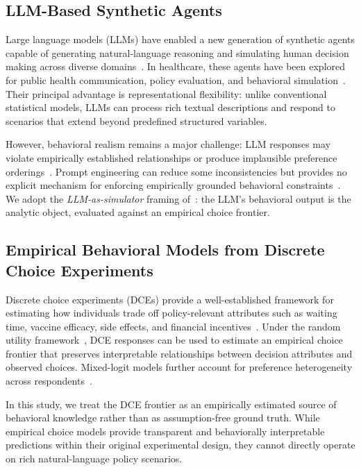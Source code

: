 \documentclass[11pt]{article}
\begin{document}
\subsection{LLM-Based Synthetic Agents}

Large language models (LLMs) have enabled a new generation of synthetic agents capable of generating natural-language reasoning and simulating human decision making across diverse domains~\citep{Bommasani2021, Park2023a, Mu2024}. In healthcare, these agents have been explored for public health communication, policy evaluation, and behavioral simulation~\citep{Sehgal2025, Gullison2025}. Their principal advantage is representational flexibility: unlike conventional statistical models, LLMs can process rich textual descriptions and respond to scenarios that extend beyond predefined structured variables.

However, behavioral realism remains a major challenge: LLM responses may violate empirically established relationships or produce implausible preference orderings~\citep{Aher2022TuringExperiments, Horton2023, hintze2025nonlinear}. Prompt engineering can reduce some inconsistencies but provides no explicit mechanism for enforcing empirically grounded behavioral constraints~\citep{wang2025simulate, wang2025heating}. We adopt the \emph{LLM-as-simulator} framing of~\citet{Argyle2023, Horton2023}: the LLM's behavioral output is the analytic object, evaluated against an empirical choice frontier.

\subsection{Empirical Behavioral Models from Discrete Choice Experiments}

Discrete choice experiments (DCEs) provide a well-established framework for estimating how individuals trade off policy-relevant attributes such as waiting time, vaccine efficacy, side effects, and financial incentives~\citep{Soekhai2019a, Chan2024}. Under the random utility framework~\citep{Train2009, louviere2000stated}, DCE responses can be used to estimate an empirical choice frontier that preserves interpretable relationships between decision attributes and observed choices. Mixed-logit models further account for preference heterogeneity across respondents~\citep{hensher2003mixed, hensher2015applied}.

In this study, we treat the DCE frontier as an empirically estimated source of behavioral knowledge rather than as assumption-free ground truth. While empirical choice models provide transparent and behaviorally interpretable predictions within their original experimental design, they cannot directly operate on rich natural-language policy scenarios.
\end{document}
